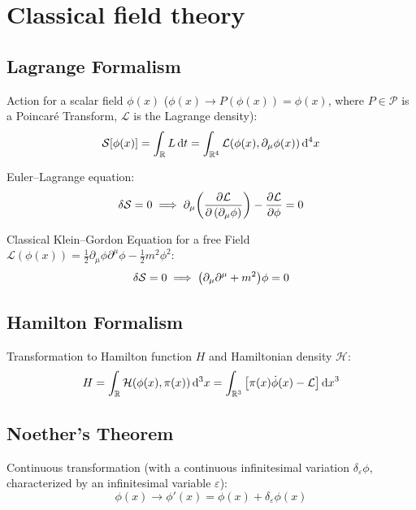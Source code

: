 \section{Classical field theory}
	\subsection{Lagrange Formalism}
		\noindent
		Action for a scalar field $\phi(x)$ (\ie $\phi(x)\to P(\phi(x))=\phi(x)$, where $P\in\mathcal{P}$ is a Poincaré Transform, $\mathcal{L}$ is the Lagrange density):
		\begin{equation}
			\mathcal{S}\qty[\phi(x)] = \int_{\mathbb{R}} L \dd{t} = \int_{\mathbb{R}^4} \mathcal{L}(\phi(x),\partial_\mu \phi(x)) \dd[4]{x}
		\end{equation}

		\noindent
		Euler--Lagrange equation:
		\begin{equation}
			\delta\mathcal{S} = 0
			\implies \partial_\mu \qty(\pdv{\mathcal{L}}{\left(\partial_\mu \phi\right)}) - \pdv{\mathcal{L}}{\phi} = 0
		\end{equation}

		\noindent
		Classical Klein--Gordon Equation for a free Field $\mathcal{L}(\phi(x)) = \frac{1}{2} \partial_\mu \phi \partial^\mu \phi - \frac{1}{2} m^2 \phi^2$:
		\begin{equation}
			\delta \mathcal{S} = 0 \implies \qty(\partial_\mu \partial^\mu + m^2)\phi = 0
		\end{equation}


	\subsection{Hamilton Formalism}
		\noindent
		Transformation to Hamilton function $H$ and Hamiltonian density $\mathcal{H}$:
		\begin{equation}
			H = \int_{\mathbb{R}} \mathcal{H}(\phi(x),\pi(x)) \dd[3]{x}= \int_{\mathbb{R}^3} \qty[\pi(x)\dot{\phi}(x) - \mathcal{L}] \dd{x}^3
		\end{equation}

	\subsection{Noether's Theorem}
		\noindent
		Continuous transformation (with a continuous infinitesimal variation $\delta_\varepsilon \phi$, characterized by an infinitesimal variable $\varepsilon$):
		\begin{equation}
			\phi(x)\to\phi'(x) = \phi(x) + \delta_\varepsilon \phi(x)
		\end{equation}

